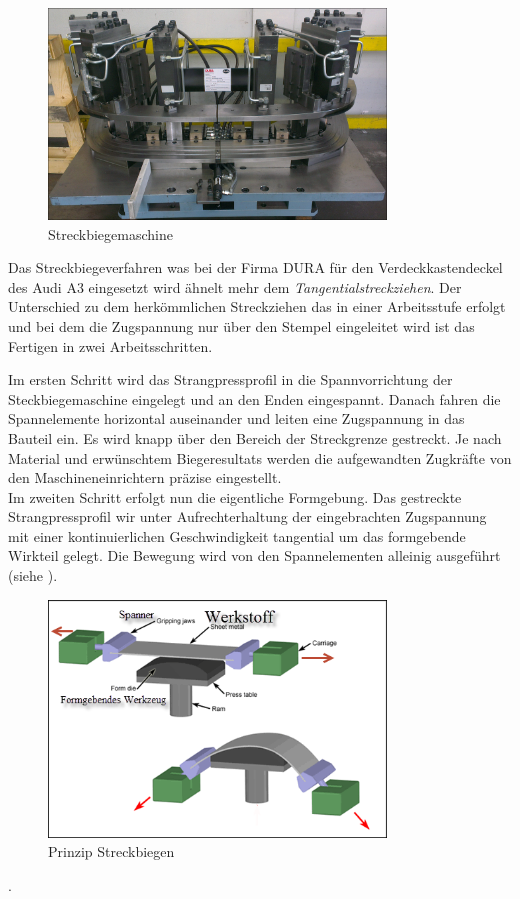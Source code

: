 \documentclass[12pt,a4paper,parskip]{scrartcl}
\begin{document}
\begin{figure}[hbtp]
\centering
\includegraphics[width=0.8\textwidth]{steckbiegeeinheit}
\caption{Streckbiegemaschine}
\label{fig:Streckbiegemaschine}
\end{figure}
Das Streckbiegeverfahren was bei der Firma DURA  für den Verdeckkastendeckel des Audi A3 eingesetzt wird ähnelt mehr dem \emph{Tangentialstreckziehen}. Der Unterschied zu dem herkömmlichen Streckziehen das in einer Arbeitsstufe erfolgt und bei dem die Zugspannung nur über den Stempel eingeleitet wird ist das Fertigen in zwei Arbeitsschritten.

 Im ersten Schritt wird das Strangpressprofil in die Spannvorrichtung der Steckbiegemaschine eingelegt und an den Enden eingespannt. Danach fahren die Spannelemente horizontal auseinander und leiten eine Zugspannung in das Bauteil ein. Es wird knapp über den Bereich der Streckgrenze gestreckt. Je nach Material und erwünschtem Biegeresultats werden die aufgewandten Zugkräfte von den Maschineneinrichtern präzise eingestellt.\\
  Im zweiten Schritt erfolgt nun die eigentliche Formgebung. Das gestreckte Strangpressprofil wir unter Aufrechterhaltung der eingebrachten Zugspannung mit einer kontinuierlichen Geschwindigkeit tangential um das formgebende Wirkteil gelegt. Die Bewegung wird von den Spannelementen alleinig ausgeführt (siehe ).
  \begin{figure}[hbtp]
  \centering
  \includegraphics[width=0.8\textwidth]{streckbiegen}
  \caption[Prinzip Streckbiegen]{Prinzip Streckbiegen\protect\footnotemark}
  \label{fig:streckbiegen} 
  \end{figure}
  . 
  
\end{document}
